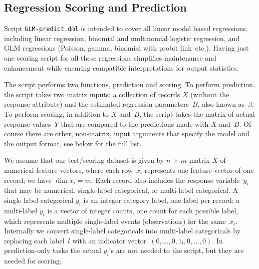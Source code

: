 \begin{comment}

 Licensed to the Apache Software Foundation (ASF) under one
 or more contributor license agreements.  See the NOTICE file
 distributed with this work for additional information
 regarding copyright ownership.  The ASF licenses this file
 to you under the Apache License, Version 2.0 (the
 "License"); you may not use this file except in compliance
 with the License.  You may obtain a copy of the License at

   http://www.apache.org/licenses/LICENSE-2.0

 Unless required by applicable law or agreed to in writing,
 software distributed under the License is distributed on an
 "AS IS" BASIS, WITHOUT WARRANTIES OR CONDITIONS OF ANY
 KIND, either express or implied.  See the License for the
 specific language governing permissions and limitations
 under the License.

\end{comment}

\subsection{Regression Scoring and Prediction}

\smallskip

Script {\tt GLM-predict.dml} is intended to cover all linear model based regressions,
including linear regression, binomial and multinomial logistic regression, and GLM
regressions (Poisson, gamma, binomial with probit link~etc.).  Having just one scoring
script for all these regressions simplifies maintenance and enhancement while ensuring
compatible interpretations for output statistics.

The script performs two functions, prediction and scoring.  To perform prediction,
the script takes two matrix inputs: a collection of records $X$ (without the response
attribute) and the estimated regression parameters~$B$, also known as~$\beta$.  
To perform scoring, in addition to $X$ and~$B$, the script takes the matrix of actual
response values~$Y$ that are compared to the predictions made with $X$ and~$B$.  Of course
there are other, non-matrix, input arguments that specify the model and the output
format, see below for the full list.

We assume that our test/scoring dataset is given by $n\,{\times}\,m$-matrix $X$ of
numerical feature vectors, where each row~$x_i$ represents one feature vector of one
record; we have \mbox{$\dim x_i = m$}.  Each record also includes the response
variable~$y_i$ that may be numerical, single-label categorical, or multi-label categorical.
A single-label categorical $y_i$ is an integer category label, one label per record;
a multi-label $y_i$ is a vector of integer counts, one count for each possible label,
which represents multiple single-label events (observations) for the same~$x_i$.  Internally
we convert single-label categoricals into multi-label categoricals by replacing each
label~$l$ with an indicator vector~$(0,\ldots,0,1_l,0,\ldots,0)$.  In prediction-only
tasks the actual $y_i$'s are not needed to the script, but they are needed for scoring.

